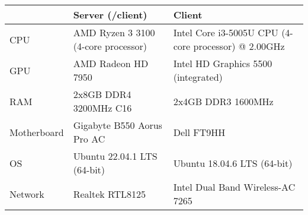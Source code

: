 \begin{tabular}{lll}
\hline
					    & Server (/client)                                           & Client                                               \\ \hline
CPU				   & AMD Ryzen 3 3100 (4-core processor)    & Intel Core i3-5005U CPU (4-core processor) @ 2.00GHz \\ \hline
GPU                & AMD Radeon HD 7950                             & Intel HD Graphics 5500 (integrated)                  \\ \hline
RAM               & 2x8GB DDR4 3200MHz C16                    & 2x4GB DDR3 1600MHz                                   \\ \hline
Motherboard & Gigabyte B550 Aorus Pro AC                   & Dell FT9HH                                           \\ \hline
OS                   & Ubuntu 22.04.1 LTS (64-bit)                      & Ubuntu 18.04.6 LTS (64-bit)                          \\ \hline
Network         &   Realtek RTL8125 &  Intel Dual Band Wireless-AC 7265                                   \\ \hline
\end{tabular}